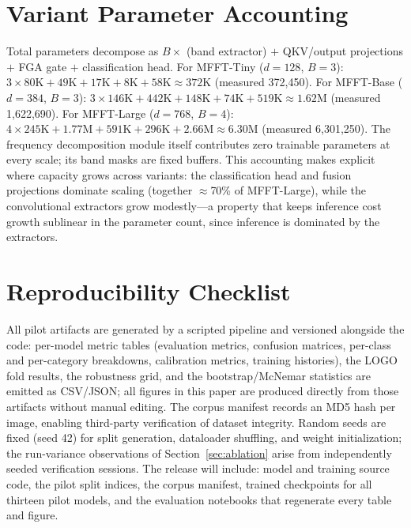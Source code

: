 \documentclass[journal]{IEEEtran}
\begin{document}
\section{Variant Parameter Accounting}
\label{app:params}
Total parameters decompose as $B \times$ (band extractor) $+$ QKV/output projections $+$ FGA gate $+$ classification head. For MFFT-Tiny ($d{=}128$, $B{=}3$): $3 \times 80\mathrm{K} + 49\mathrm{K} + 17\mathrm{K} + 8\mathrm{K} + 58\mathrm{K} \approx 372\mathrm{K}$ (measured 372{,}450). For MFFT-Base ($d{=}384$, $B{=}3$): $3 \times 146\mathrm{K} + 442\mathrm{K} + 148\mathrm{K} + 74\mathrm{K} + 519\mathrm{K} \approx 1.62\mathrm{M}$ (measured 1{,}622{,}690). For MFFT-Large ($d{=}768$, $B{=}4$): $4 \times 245\mathrm{K} + 1.77\mathrm{M} + 591\mathrm{K} + 296\mathrm{K} + 2.66\mathrm{M} \approx 6.30\mathrm{M}$ (measured 6{,}301{,}250). The frequency decomposition module itself contributes zero trainable parameters at every scale; its band masks are fixed buffers. This accounting makes explicit where capacity grows across variants: the classification head and fusion projections dominate scaling (together $\approx$70\% of MFFT-Large), while the convolutional extractors grow modestly---a property that keeps inference cost growth sublinear in the parameter count, since inference is dominated by the extractors.

\section{Reproducibility Checklist}
\label{app:repro}
All pilot artifacts are generated by a scripted pipeline and versioned alongside the code: per-model metric tables (evaluation metrics, confusion matrices, per-class and per-category breakdowns, calibration metrics, training histories), the LOGO fold results, the robustness grid, and the bootstrap/McNemar statistics are emitted as CSV/JSON; all figures in this paper are produced directly from those artifacts without manual editing. The corpus manifest records an MD5 hash per image, enabling third-party verification of dataset integrity. Random seeds are fixed (seed 42) for split generation, dataloader shuffling, and weight initialization; the run-variance observations of Section~\ref{sec:ablation} arise from independently seeded verification sessions. The release will include: model and training source code, the pilot split indices, the corpus manifest, trained checkpoints for all thirteen pilot models, and the evaluation notebooks that regenerate every table and figure.
\end{document}
